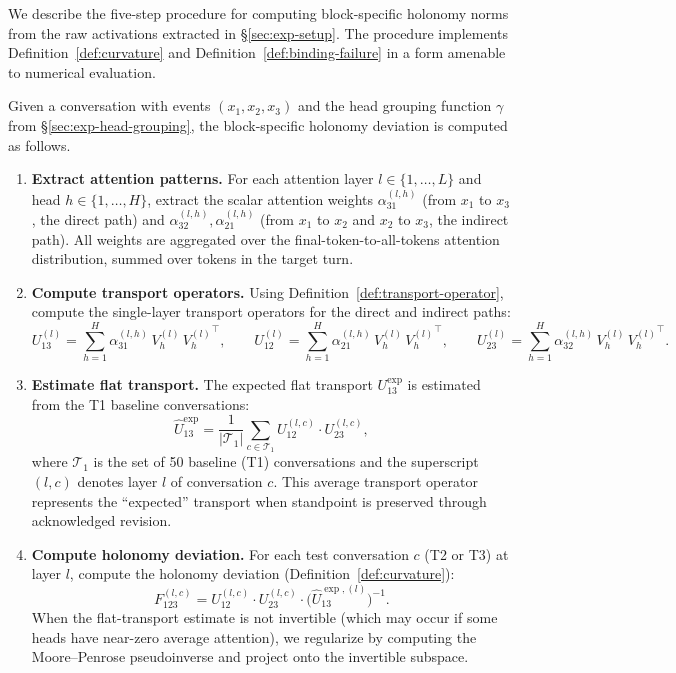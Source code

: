 We describe the five-step procedure for computing block-specific holonomy norms from the
raw activations extracted in \S\ref{sec:exp-setup}. The procedure implements
Definition~\ref{def:curvature} and Definition~\ref{def:binding-failure} in a form amenable
to numerical evaluation.

\begin{definition}
\label{def:curvature-pipeline}
Given a conversation with events $(x_1, x_2, x_3)$ and the head grouping function $\gamma$
from \S\ref{sec:exp-head-grouping}, the block-specific holonomy deviation is computed as follows.

\begin{enumerate}
    \item \textbf{Extract attention patterns.} For each attention layer $l \in \{1, \ldots,
    L\}$ and head $h \in \{1, \ldots, H\}$, extract the scalar attention weights
    $\alpha_{31}^{(l,h)}$ (from $x_1$ to $x_3$, the direct path) and $\alpha_{32}^{(l,h)},
    \alpha_{21}^{(l,h)}$ (from $x_1$ to $x_2$ and $x_2$ to $x_3$, the indirect path).
    All weights are aggregated over the final-token-to-all-tokens attention distribution,
    summed over tokens in the target turn.

    \item \textbf{Compute transport operators.} Using Definition~\ref{def:transport-operator},
    compute the single-layer transport operators for the direct and indirect paths:
    \[
        U_{13}^{(l)} = \sum_{h=1}^{H} \alpha_{31}^{(l,h)}\, V_h^{(l)}\, {V_h^{(l)}}^\top,
        \qquad
        U_{12}^{(l)} = \sum_{h=1}^{H} \alpha_{21}^{(l,h)}\, V_h^{(l)}\, {V_h^{(l)}}^\top,
        \qquad
        U_{23}^{(l)} = \sum_{h=1}^{H} \alpha_{32}^{(l,h)}\, V_h^{(l)}\, {V_h^{(l)}}^\top.
    \]

    \item \textbf{Estimate flat transport.} The expected flat transport $U_{13}^{\exp}$ is
    estimated from the T1 baseline conversations:
    \[
        \widehat{U}_{13}^{\exp} = \frac{1}{|\mathcal{T}_1|} \sum_{c \in \mathcal{T}_1}
        U_{12}^{(l,c)} \cdot U_{23}^{(l,c)},
    \]
    where $\mathcal{T}_1$ is the set of 50 baseline (T1) conversations and the superscript
    $(l,c)$ denotes layer $l$ of conversation $c$. This average transport operator represents
    the ``expected'' transport when standpoint is preserved through acknowledged revision.

    \item \textbf{Compute holonomy deviation.} For each test conversation $c$ (T2 or T3) at layer $l$,
    compute the holonomy deviation (Definition~\ref{def:curvature}):
    \[
        F_{123}^{(l,c)} = U_{12}^{(l,c)} \cdot U_{23}^{(l,c)} \cdot
        \big(\widehat{U}_{13}^{\exp,(l)}\big)^{-1}.
    \]
    When the flat-transport estimate is not invertible (which may occur if some heads have
    near-zero average attention), we regularize by computing the Moore--Penrose pseudoinverse
    and project onto the invertible subspace.


\end{enumerate}
\end{definition}

